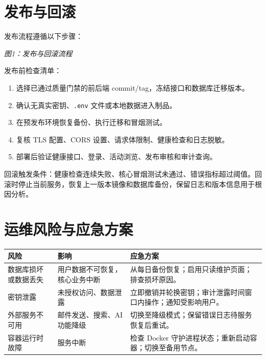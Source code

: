 \documentclass[12pt,a4paper]{ctexart}
\begin{document}
\section{发布与回滚}
发布流程遵循以下步骤：
\begin{center}
\vspace{0.2em}
{\par\small\itshape 图1：发布与回滚流程}
\end{center}

发布前检查清单：
\begin{enumerate}
\item 选择已通过质量门禁的前后端 commit/tag，冻结接口和数据库迁移版本。
\item 确认无真实密钥、\texttt{.env} 文件或本地数据进入制品。
\item 在预发布环境恢复备份、执行迁移和冒烟测试。
\item 复核 TLS 配置、CORS 设置、请求体限制、健康检查和日志脱敏。
\item 部署后验证健康接口、登录、活动浏览、发布审核和审计查询。
\end{enumerate}
回滚触发条件：健康检查连续失败、核心冒烟测试未通过、错误指标超过阈值。回滚时停止当前服务，恢复上一版本镜像和数据库备份，保留日志和版本信息用于根因分析。

\section{运维风险与应急方案}
\noindent\begin{tabularx}{\textwidth}{p{3cm}Y p{4.5cm}}
\toprule 风险 & 影响 & 应急方案 \\\midrule
数据库损坏或数据丢失 & 用户数据不可恢复，核心业务中断 & 从每日备份恢复；启用只读维护页面；排查损坏原因。 \\
密钥泄露 & 未授权访问、数据泄露 & 立即撤销并轮换密钥；审计泄露时间窗口内操作；通知受影响用户。 \\
外部服务不可用 & 邮件发送、搜索、AI 功能降级 & 切换至降级模式；保留错误日志待服务恢复后重试。 \\
容器运行时故障 & 服务中断 & 检查 Docker 守护进程状态；重新启动容器；切换至备用节点。 \\
\bottomrule
\end{tabularx}
\end{document}

